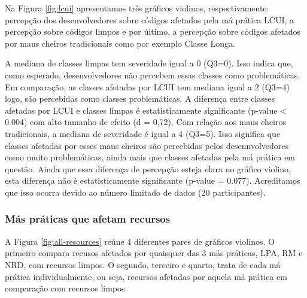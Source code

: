 Na Figura \ref{fig:lcui} apresentamos três gráficos violinos, respectivamente: percepção dos desenvolvedores sobre códigos afetados pela má prática LCUI, a percepção sobre códigos limpos e por último, a percepção sobre códigos afetados por maus cheiros tradicionais como por exemplo Classe Longa. 

A mediana de classes limpas tem severidade igual a 0 (Q3=0). Isso indica que, como esperado, desenvolvedores não percebem essas classes como problemáticas. Em comparação, as classes afetadas por LCUI tem mediana igual a 2 (Q3=4) logo, são percebidas como classes problemáticas. A diferença entre classes afetadas por LCUI e classes limpas é estatisticamente significante (p-value < 0.004) com alto tamanho de efeito (d = 0,72). Com relação aos maus cheiros tradicionais, a mediana de severidade é igual a 4 (Q3=5). Isso significa que classes afetadas por esses maus cheiros são percebidas pelos desennvolvedores como muito problemáticas, ainda mais que classes afetadas pela má prática em questão. Ainda que essa diferença de percepção esteja clara no gráfico violino, esta diferença não é estatisticamente significante (p-value = 0.077). Acreditamos que isso ocorra devido ao número limitado de dados (20 participantes).


\subsubsection{Más práticas que afetam recursos}

A Figura \ref{fig:all-resources} reúne 4 diferentes pares de gráficos violinos. O primeiro compara recusos afetados por quaisquer das 3 más práticas, LPA, RM e NRD, com recursos limpos. O segundo, terceiro e quarto, trata de cada má prática individualmente, ou seja, recursos afetadas por aquela má prática em comparação com recursos limpos. 

